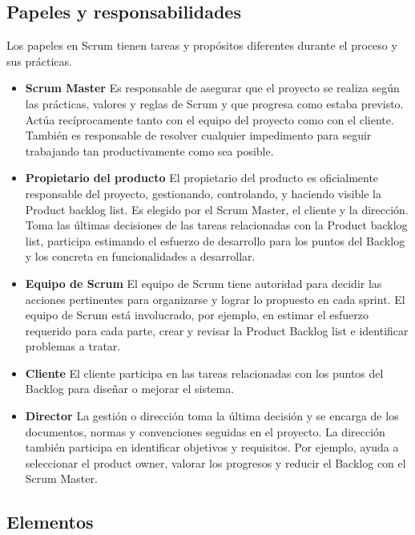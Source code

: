 \subsection{Papeles y responsabilidades}
Los papeles en Scrum tienen tareas y propósitos diferentes durante el proceso y sus prácticas.

\begin{itemize}
\item \textbf{Scrum Master} Es responsable de asegurar que el proyecto se realiza según las prácticas, valores y reglas de Scrum y que progresa como estaba previsto. Actúa recíprocamente tanto con el equipo del proyecto como con el cliente. También es responsable de resolver cualquier impedimento para seguir trabajando tan productivamente como sea posible. 

\item \textbf{Propietario del producto} El propietario del producto es oficialmente responsable del proyecto, gestionando, controlando, y haciendo visible la Product backlog list. Es elegido por el Scrum Master, el cliente y la dirección. Toma las últimas decisiones de las tareas relacionadas con la Product backlog list, participa estimando el esfuerzo de desarrollo para los puntos del Backlog y los concreta en funcionalidades a desarrollar.

\item \textbf{Equipo de Scrum} El equipo de Scrum tiene autoridad para decidir las acciones pertinentes para organizarse y lograr lo propuesto en cada sprint. El equipo de Scrum está involucrado, por ejemplo, en estimar el esfuerzo requerido para cada parte, crear y revisar la Product Backlog list e identificar problemas a tratar.

\item \textbf{Cliente} El cliente participa en las tareas relacionadas con los puntos del Backlog para diseñar o mejorar el sistema.

\item \textbf{Director} La gestión o dirección toma la última decisión y se encarga de los documentos, normas y convenciones seguidas en el proyecto. La dirección también participa en identificar objetivos y requisitos. Por ejemplo, ayuda a seleccionar el product owner, valorar los progresos y reducir el Backlog con el Scrum Master.
\end{itemize}

\subsection{Elementos}
